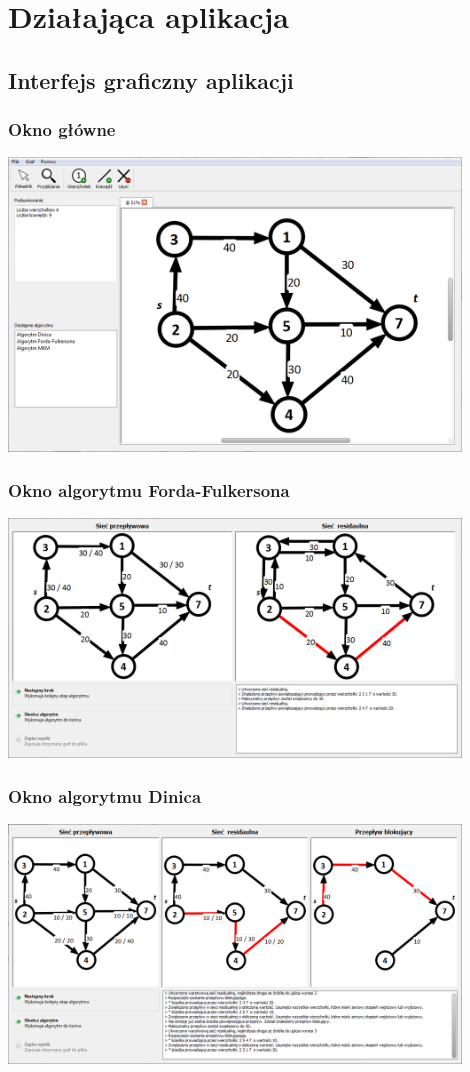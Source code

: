 \documentclass{beamer}
\begin{document}
\section{Działająca aplikacja}
\subsection{Interfejs graficzny aplikacji}
\begin{frame}\frametitle{Okno główne}
	\begin{center}
		\includegraphics[width=0.9\textwidth]{./img/pres_screen1}
	\end{center}
\end{frame}
\begin{frame}\frametitle{Okno algorytmu Forda-Fulkersona}
	\begin{center}
		\includegraphics[width=0.9\textwidth]{./img/pres_screen2}
	\end{center}
\end{frame}
\begin{frame}\frametitle{Okno algorytmu Dinica}
	\begin{center}
		\includegraphics[width=0.9\textwidth]{./img/pres_screen3}
	\end{center}
\end{frame}
\end{document}
